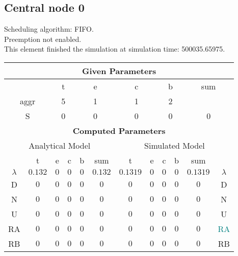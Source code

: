 \documentclass{article}
\begin{document}
\subsection{Central node 0}
Scheduling algorithm: FIFO.\\Preemption not enabled. \\This element finished the simulation at simulation time: 500035.65975.\\
\begin{table}[H]\centering\begin{tabular}{@{}c|cccc|c||cccc|c|c@{}}\toprule\multicolumn{12}{c}{\textbf{Given Parameters}}\\\midrule\multicolumn{2}{c|}{ } & \multicolumn{2}{c}{t} & \multicolumn{2}{c}{e} & \multicolumn{2}{c}{c} & \multicolumn{2}{c}{b} & \multicolumn{2}{|c}{sum} \\\midrule\multicolumn{2}{c|}{aggr} & \multicolumn{2}{c}{5} & \multicolumn{2}{c}{1} & \multicolumn{2}{c}{1} & \multicolumn{2}{c}{2} & \multicolumn{2}{|c}{ } \\ \midrule\multicolumn{2}{c|}{S} & \multicolumn{2}{c}{0} & \multicolumn{2}{c}{0} & \multicolumn{2}{c}{0} & \multicolumn{2}{c}{0} & \multicolumn{2}{|c}{0}\\ \midrule\midrule\multicolumn{12}{c}{\textbf{Computed Parameters}}\\ \midrule\multicolumn{6}{c||}{Analytical Model} & \multicolumn{6}{c}{Simulated Model}\\ 
 \midrule & t & e & c & b & sum & t & e & c & b & sum &  \\ \midrule$\lambda$ &$0.132$ & $0$ & $0$ & $0$ & $0.132$ & $0.1319$ & $0$ & $0$ & $0$ & $0.1319$& $\lambda$ \\D & $0$ & $0$ & $0$ & $0$ & $0$ & $0$ & $0$ & $0$ & $0$ & $0$& D\\N & $0$ & $0$ & $0$ & $0$ & $0$ & $0$ & $0$ & $0$ & $0$ & $0$& N\\U & $0$ & $0$ & $0$ & $0$ & $0$ & $0$ & $0$ & $0$ & $0$ & $0$& U\\RA & $0$ & $0$ & $0$ & $0$ & $0$ & $0$ & $0$ & $0$ & $0$ & $0$& \textcolor{teal}{RA}\\RB & $0$ & $0$ & $0$ & $0$ & $0$ & $0$ & $0$ & $0$ & $0$ & $0$& RB\\
\bottomrule
\end{tabular}
\end{table}
\filbreak
\end{document}
